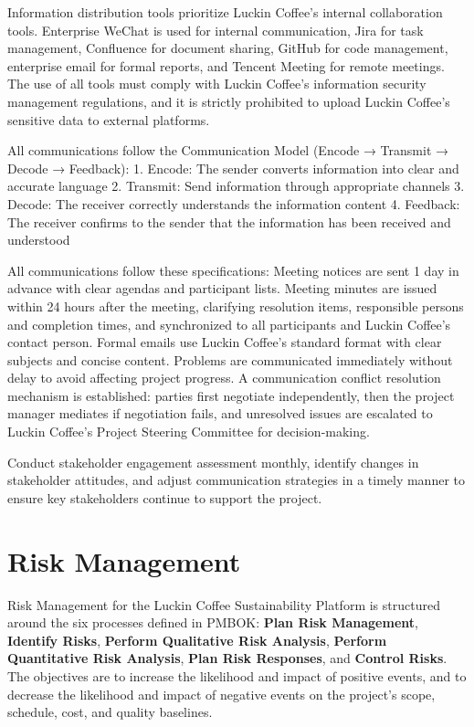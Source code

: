 \documentclass[12pt,a4paper]{article}
\begin{document}
\vspace{1em}
Information distribution tools prioritize Luckin Coffee's internal collaboration tools. Enterprise WeChat is used for internal communication, Jira for task management, Confluence for document sharing, GitHub for code management, enterprise email for formal reports, and Tencent Meeting for remote meetings. The use of all tools must comply with Luckin Coffee's information security management regulations, and it is strictly prohibited to upload Luckin Coffee's sensitive data to external platforms.

All communications follow the Communication Model (Encode → Transmit → Decode → Feedback):
1. Encode: The sender converts information into clear and accurate language
2. Transmit: Send information through appropriate channels
3. Decode: The receiver correctly understands the information content
4. Feedback: The receiver confirms to the sender that the information has been received and understood

All communications follow these specifications: Meeting notices are sent 1 day in advance with clear agendas and participant lists. Meeting minutes are issued within 24 hours after the meeting, clarifying resolution items, responsible persons and completion times, and synchronized to all participants and Luckin Coffee's contact person. Formal emails use Luckin Coffee's standard format with clear subjects and concise content. Problems are communicated immediately without delay to avoid affecting project progress. A communication conflict resolution mechanism is established: parties first negotiate independently, then the project manager mediates if negotiation fails, and unresolved issues are escalated to Luckin Coffee's Project Steering Committee for decision-making.

\noindent Conduct stakeholder engagement assessment monthly, identify changes in stakeholder attitudes, and adjust communication strategies in a timely manner to ensure key stakeholders continue to support the project.

\clearpage
\section{Risk Management}

Risk Management for the Luckin Coffee Sustainability Platform is structured around the six processes defined in PMBOK: \textbf{Plan Risk Management}, \textbf{Identify Risks}, \textbf{Perform Qualitative Risk Analysis}, \textbf{Perform Quantitative Risk Analysis}, \textbf{Plan Risk Responses}, and \textbf{Control Risks}. The objectives are to increase the likelihood and impact of positive events, and to decrease the likelihood and impact of negative events on the project's scope, schedule, cost, and quality baselines.
\end{document}
